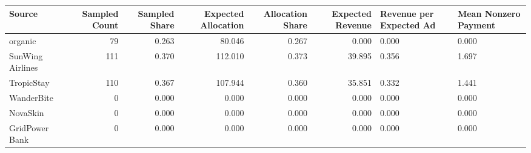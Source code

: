 \begin{tabular}{lrrrrr}
\hline
Source & Sampled Count & Sampled Share & Expected Allocation & Allocation Share & Expected Revenue & Revenue per Expected Ad & Mean Nonzero Payment \\
\hline
organic & 79 & 0.263 & 80.046 & 0.267 & 0.000 & 0.000 & 0.000 \\
SunWing Airlines & 111 & 0.370 & 112.010 & 0.373 & 39.895 & 0.356 & 1.697 \\
TropicStay & 110 & 0.367 & 107.944 & 0.360 & 35.851 & 0.332 & 1.441 \\
WanderBite & 0 & 0.000 & 0.000 & 0.000 & 0.000 & 0.000 & 0.000 \\
NovaSkin & 0 & 0.000 & 0.000 & 0.000 & 0.000 & 0.000 & 0.000 \\
GridPower Bank & 0 & 0.000 & 0.000 & 0.000 & 0.000 & 0.000 & 0.000 \\
\hline
\end{tabular}
